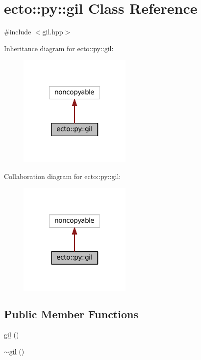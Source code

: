 \hypertarget{classecto_1_1py_1_1gil}{\section{ecto\-:\-:py\-:\-:gil Class Reference}
\label{classecto_1_1py_1_1gil}
}


{\ttfamily \#include $<$gil.\-hpp$>$}



Inheritance diagram for ecto\-:\-:py\-:\-:gil\-:\nopagebreak
\begin{figure}[H]
\begin{center}
\leavevmode
\includegraphics[width=156pt]{classecto_1_1py_1_1gil__inherit__graph}
\end{center}
\end{figure}


Collaboration diagram for ecto\-:\-:py\-:\-:gil\-:\nopagebreak
\begin{figure}[H]
\begin{center}
\leavevmode
\includegraphics[width=156pt]{classecto_1_1py_1_1gil__coll__graph}
\end{center}
\end{figure}
\subsection*{Public Member Functions}
\begin{DoxyCompactItemize}
\item 
\hyperlink{classecto_1_1py_1_1gil_aad7e0cb610b4766dbdfa918227e806cc}{gil} ()
\item 
\hyperlink{classecto_1_1py_1_1gil_a18685c76c39837ddf90159fb0721ab62}{$\sim$gil} ()
\end{DoxyCompactItemize}
